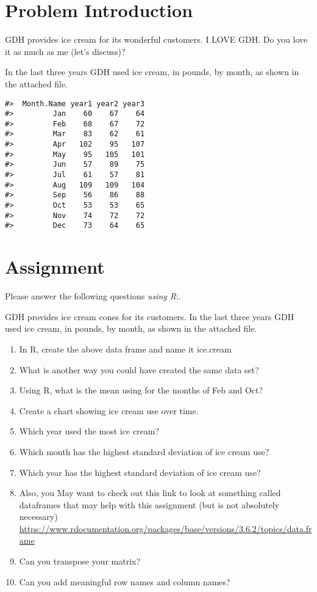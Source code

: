 \documentclass[
]{book}
\providecommand{\tightlist}{%
  \setlength{\itemsep}{0pt}\setlength{\parskip}{0pt}}
\begin{document}
\hypertarget{problem-introduction}{%
\section{Problem Introduction}\label{problem-introduction}}

GDH provides ice cream for its wonderful customers. I LOVE GDH. Do you love it as much as me (let's discuss)?

In the last three years GDH used ice cream, in pounds, by month, as shown in the attached file.

\begin{verbatim}
#>  Month.Name year1 year2 year3
#>         Jan    60    67    64
#>         Feb    68    67    72
#>         Mar    83    62    61
#>         Apr   102    95   107
#>         May    95   105   101
#>         Jun    57    89    75
#>         Jul    61    57    81
#>         Aug   109   109   104
#>         Sep    56    86    88
#>         Oct    53    53    65
#>         Nov    74    72    72
#>         Dec    73    64    65
\end{verbatim}

\hypertarget{assignment}{%
\section{Assignment}\label{assignment}}

Please answer the following questions \emph{using R}:.

GDH provides ice cream cones for its customers. In the last three years GDH used ice cream, in pounds, by month, as shown in the attached file.

\begin{enumerate}
\def\labelenumi{\arabic{enumi}.}
\tightlist
\item
  In R, create the above data frame and name it ice.cream
\item
  What is another way you could have created the same data set?
\item
  Using R, what is the mean using for the months of Feb and Oct?
\item
  Create a chart showing ice cream use over time.
\item
  Which year used the most ice cream?
\item
  Which month has the highest standard deviation of ice cream use?
\item
  Which year has the highest standard deviation of ice cream use?
\item
  Also, you May want to check out this link to look at something called dataframes that may help with this assignment (but is not absolutely necessary) \url{https://www.rdocumentation.org/packages/base/versions/3.6.2/topics/data.frame}
\item
  Can you transpose your matrix?
\item
  Can you add meaningful row names and column names?
\end{enumerate}
\end{document}
